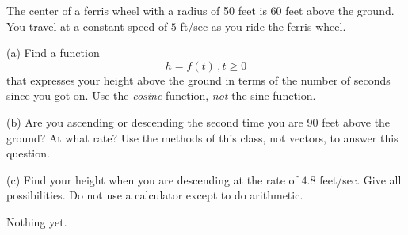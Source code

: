\documentclass{ximera}
\begin{document}
\begin{question} \label{Q:324gg434}
The center of a ferris wheel with a radius of 50 feet is 60 feet above the ground. You travel at a constant speed of $5$ ft/sec as you ride the ferris wheel.

(a)  Find a function 
\[
 h = f(t) \, , t\geq 0
\] 
that expresses your height above the ground in terms of the number of seconds since you got on. Use the \emph{cosine} function, \emph{not} the sine function.

(b) Are you ascending or descending the second time you are 90 feet above the ground? At what rate? Use the methods of this class, not vectors, to answer this question.

(c) Find your height when you are descending at the rate of $4.8$ feet/sec. Give all possibilities. Do not use a calculator except to do arithmetic.

\end{question}


\begin{question}  \label{QDDFDF}
Nothing yet.
\end{question}
\end{document}
